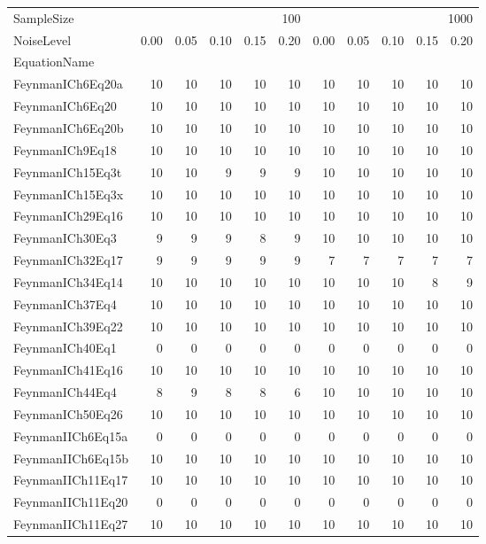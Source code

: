 \begin{tabular}{lrrrrrrrrrr}
\toprule
SampleSize & \multicolumn{5}{r}{100} & \multicolumn{5}{r}{1000} \\
NoiseLevel & 0.00 & 0.05 & 0.10 & 0.15 & 0.20 & 0.00 & 0.05 & 0.10 & 0.15 & 0.20 \\
EquationName &  &  &  &  &  &  &  &  &  &  \\
\midrule
FeynmanICh6Eq20a & 10 & 10 & 10 & 10 & 10 & 10 & 10 & 10 & 10 & 10 \\
FeynmanICh6Eq20 & 10 & 10 & 10 & 10 & 10 & 10 & 10 & 10 & 10 & 10 \\
FeynmanICh6Eq20b & 10 & 10 & 10 & 10 & 10 & 10 & 10 & 10 & 10 & 10 \\
FeynmanICh9Eq18 & 10 & 10 & 10 & 10 & 10 & 10 & 10 & 10 & 10 & 10 \\
FeynmanICh15Eq3t & 10 & 10 & 9 & 9 & 9 & 10 & 10 & 10 & 10 & 10 \\
FeynmanICh15Eq3x & 10 & 10 & 10 & 10 & 10 & 10 & 10 & 10 & 10 & 10 \\
FeynmanICh29Eq16 & 10 & 10 & 10 & 10 & 10 & 10 & 10 & 10 & 10 & 10 \\
FeynmanICh30Eq3 & 9 & 9 & 9 & 8 & 9 & 10 & 10 & 10 & 10 & 10 \\
FeynmanICh32Eq17 & 9 & 9 & 9 & 9 & 9 & 7 & 7 & 7 & 7 & 7 \\
FeynmanICh34Eq14 & 10 & 10 & 10 & 10 & 10 & 10 & 10 & 10 & 8 & 9 \\
FeynmanICh37Eq4 & 10 & 10 & 10 & 10 & 10 & 10 & 10 & 10 & 10 & 10 \\
FeynmanICh39Eq22 & 10 & 10 & 10 & 10 & 10 & 10 & 10 & 10 & 10 & 10 \\
FeynmanICh40Eq1 & 0 & 0 & 0 & 0 & 0 & 0 & 0 & 0 & 0 & 0 \\
FeynmanICh41Eq16 & 10 & 10 & 10 & 10 & 10 & 10 & 10 & 10 & 10 & 10 \\
FeynmanICh44Eq4 & 8 & 9 & 8 & 8 & 6 & 10 & 10 & 10 & 10 & 10 \\
FeynmanICh50Eq26 & 10 & 10 & 10 & 10 & 10 & 10 & 10 & 10 & 10 & 10 \\
FeynmanIICh6Eq15a & 0 & 0 & 0 & 0 & 0 & 0 & 0 & 0 & 0 & 0 \\
FeynmanIICh6Eq15b & 10 & 10 & 10 & 10 & 10 & 10 & 10 & 10 & 10 & 10 \\
FeynmanIICh11Eq17 & 10 & 10 & 10 & 10 & 10 & 10 & 10 & 10 & 10 & 10 \\
FeynmanIICh11Eq20 & 0 & 0 & 0 & 0 & 0 & 0 & 0 & 0 & 0 & 0 \\
FeynmanIICh11Eq27 & 10 & 10 & 10 & 10 & 10 & 10 & 10 & 10 & 10 & 10 \\

\end{tabular}
